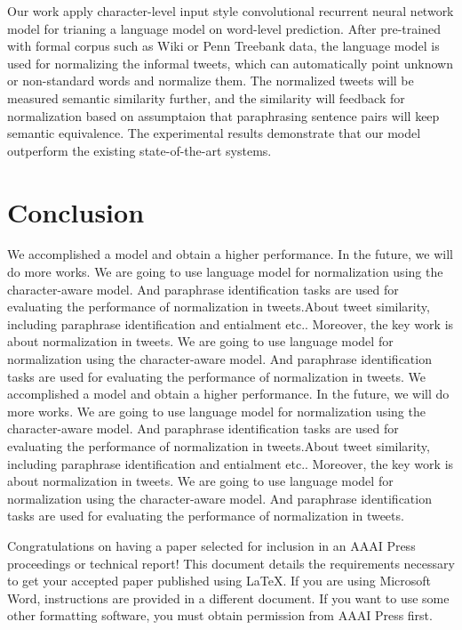 \documentclass[letterpaper]{article}
\begin{document}
Our work apply character-level input style convolutional recurrent neural network model for trianing a language model on word-level prediction. After pre-trained with formal corpus such as Wiki or Penn Treebank data, the language model is used for normalizing the informal tweets, which can automatically point unknown or non-standard words and normalize them. The normalized tweets will be measured semantic similarity further, and the similarity will feedback for normalization based on assumptaion that paraphrasing sentence pairs will keep semantic equivalence. The experimental results demonstrate that our model outperform the existing state-of-the-art systems.

\section{Conclusion}
We accomplished a model and obtain a higher performance. In the future, we will do more works. We are going to use language model for normalization using the character-aware model. And paraphrase identification tasks are used for evaluating the performance of normalization in tweets.About tweet similarity, including paraphrase identification and entialment etc.. Moreover, the key work is about normalization in tweets. We are going to use language model for normalization using the character-aware model. And paraphrase identification tasks are used for evaluating the performance of normalization in tweets. We accomplished a model and obtain a higher performance. In the future, we will do more works. We are going to use language model for normalization using the character-aware model. And paraphrase identification tasks are used for evaluating the performance of normalization in tweets.About tweet similarity, including paraphrase identification and entialment etc.. Moreover, the key work is about normalization in tweets. We are going to use language model for normalization using the character-aware model. And paraphrase identification tasks are used for evaluating the performance of normalization in tweets.








\noindent Congratulations on having a paper selected for inclusion in an AAAI Press proceedings or technical report! This document details the requirements necessary to get your accepted paper published using \LaTeX{}. If you are using Microsoft Word, instructions are provided in a different document. If you want to use some other formatting software, you must obtain permission from AAAI Press first. 
\end{document}
